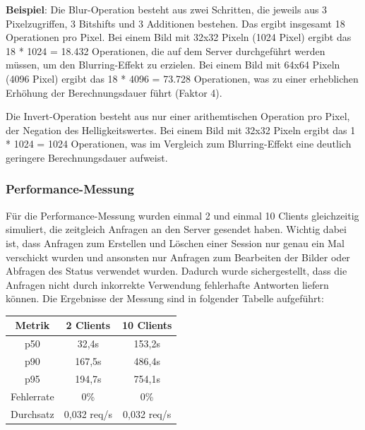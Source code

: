 \textbf{Beispiel}:
Die Blur-Operation besteht aus zwei Schritten, die jeweils aus 3 Pixelzugriffen, 3 Bitshifts und 3 Additionen bestehen. Das ergibt insgesamt 18 Operationen pro Pixel. Bei einem Bild mit 32x32 Pixeln (1024 Pixel) ergibt das 18 * 1024 = 18.432 Operationen, die auf dem Server durchgeführt werden müssen, um den Blurring-Effekt zu erzielen. Bei einem Bild mit 64x64 Pixeln (4096 Pixel) ergibt das 18 * 4096 = 73.728 Operationen, was zu einer erheblichen Erhöhung der Berechnungsdauer führt (Faktor 4).

Die Invert-Operation besteht aus nur einer arithemtischen Operation pro Pixel, der Negation des Helligkeitswertes. Bei einem Bild mit 32x32 Pixeln ergibt das 1 * 1024 = 1024 Operationen, was im Vergleich zum Blurring-Effekt eine deutlich geringere Berechnungsdauer aufweist.

\subsubsection{Performance-Messung}
Für die Performance-Messung wurden einmal 2 und einmal 10 Clients gleichzeitig simuliert, die zeitgleich Anfragen an den Server gesendet haben. Wichtig dabei ist, dass Anfragen zum Erstellen und Löschen einer Session nur genau ein Mal verschickt wurden und ansonsten nur Anfragen zum Bearbeiten der Bilder oder Abfragen des Status verwendet wurden. Dadurch wurde sichergestellt, dass die Anfragen nicht durch inkorrekte Verwendung fehlerhafte Antworten liefern können. Die Ergebnisse der Messung sind in folgender Tabelle aufgeführt:
\begin{tabular}{||c|c|c||}
    \hline
    \textbf{Metrik} & \textbf{2 Clients} & \textbf{10 Clients} \\
    \hline\hline
    p50 & 32,4s & 153,2s \\
    \hline
    p90 & 167,5s & 486,4s \\
    \hline
    p95 & 194,7s & 754,1s \\
    \hline
    Fehlerrate & 0\% & 0\% \\
    \hline
    Durchsatz & 0,032 req/s & 0,032 req/s \\
    \hline
\end{tabular}

